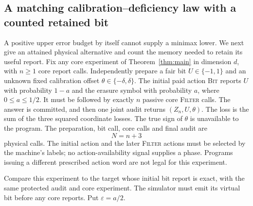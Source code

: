 \subsection{A matching calibration--deficiency law with a counted retained bit}
A positive upper error budget by itself cannot supply a minimax lower. We next give an attained physical alternative and count the memory needed to retain its useful report. Fix any core experiment of Theorem~\ref{thm:main} in dimension $d$, with $n\ge1$ core report calls. Independently prepare a fair bit $U\in\{-1,1\}$ and an unknown fixed calibration offset $\theta\in\{-\delta,\delta\}$. The initial paid action \textsc{Bit} reports $U$ with probability $1-a$ and the erasure symbol with probability $a$, where $0\le a\le1/2$. It must be followed by exactly $n$ passive core \textsc{Filter} calls. The answer is committed, and then one joint audit returns $(Z_n,U,\theta)$. The loss is the sum of the three squared coordinate losses. The true sign of $\theta$ is unavailable to the program. The preparation, bit call, core calls and final audit are
\begin{equation}\label{eq:physical-N}
 N=n+3
\end{equation}
physical calls. The initial action and the later \textsc{Filter} actions must be selected by the machine's labels; no action-availability signal supplies a phase. Programs issuing a different prescribed action word are not legal for this experiment.

Compare this experiment to the target whose initial bit report is exact, with the same protected audit and core experiment. The simulator must emit its virtual bit before any core reports. Put $\varepsilon=a/2$.

